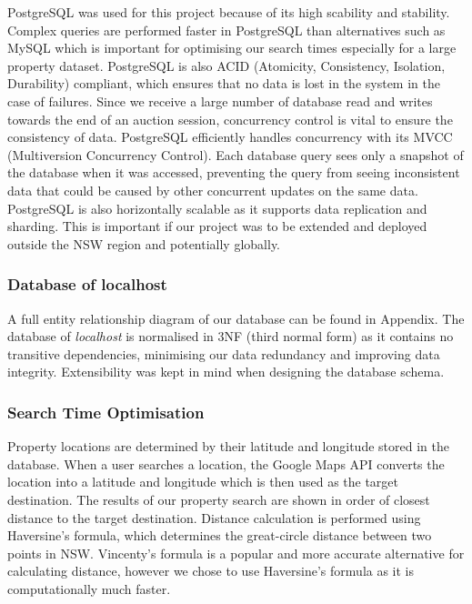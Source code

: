 PostgreSQL was used for this project because of its high scability and stability.
Complex queries are performed faster in PostgreSQL than alternatives such as MySQL
which is important for optimising our search times especially for a large property
dataset. PostgreSQL is also ACID (Atomicity, Consistency, Isolation, Durability)
compliant, which ensures that no data is lost in the system in the case of failures.
Since we receive a large number of database read and writes towards the end
of an auction session, concurrency control is vital to ensure the consistency
of data. PostgreSQL efficiently handles concurrency with its MVCC (Multiversion
Concurrency Control). Each database query sees only a snapshot of the database
when it was accessed, preventing the query from seeing inconsistent data that
could be caused by other concurrent updates on the same data. PostgreSQL is also
horizontally scalable as it supports data replication and sharding.
This is important if our project was to be extended and deployed outside the NSW
region and potentially globally.

\subsubsection{Database of localhost}

A full entity relationship diagram of our database can be found in Appendix.
The database of \emph{localhost} is normalised in 3NF (third normal form) as it
contains no transitive dependencies, minimising our data redundancy and
improving data integrity. Extensibility was kept in mind when designing the
database schema.

\subsubsection{Search Time Optimisation}

Property locations are determined by their latitude and longitude stored in the
database. When a user searches a location, the Google Maps API converts the location
into a latitude and longitude which is then used as the target destination.
The results of our property search are shown in order of closest distance to the
target destination.
Distance calculation is performed using Haversine's formula, which determines the
great-circle distance between two points in NSW. Vincenty's formula is a popular and
more accurate alternative for calculating distance, however we chose to
use Haversine's formula as it is computationally much faster.

